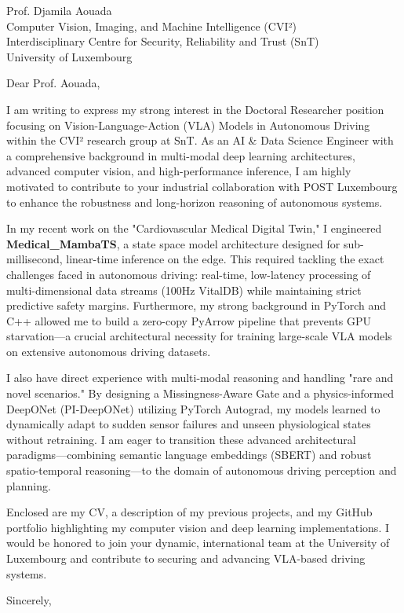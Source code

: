 \documentclass[11pt,a4paper]{letter}
\begin{document}
\begin{letter}{
    Prof. Djamila Aouada \\
    Computer Vision, Imaging, and Machine Intelligence (CVI²) \\
    Interdisciplinary Centre for Security, Reliability and Trust (SnT) \\
    University of Luxembourg
}

\opening{Dear Prof. Aouada,}

I am writing to express my strong interest in the Doctoral Researcher position focusing on Vision-Language-Action (VLA) Models in Autonomous Driving within the CVI² research group at SnT. As an AI \& Data Science Engineer with a comprehensive background in multi-modal deep learning architectures, advanced computer vision, and high-performance inference, I am highly motivated to contribute to your industrial collaboration with POST Luxembourg to enhance the robustness and long-horizon reasoning of autonomous systems.

In my recent work on the "Cardiovascular Medical Digital Twin," I engineered \textbf{Medical\_MambaTS}, a state space model architecture designed for sub-millisecond, linear-time inference on the edge. This required tackling the exact challenges faced in autonomous driving: real-time, low-latency processing of multi-dimensional data streams (100Hz VitalDB) while maintaining strict predictive safety margins. Furthermore, my strong background in PyTorch and C++ allowed me to build a zero-copy PyArrow pipeline that prevents GPU starvation—a crucial architectural necessity for training large-scale VLA models on extensive autonomous driving datasets.

I also have direct experience with multi-modal reasoning and handling "rare and novel scenarios." By designing a Missingness-Aware Gate and a physics-informed DeepONet (PI-DeepONet) utilizing PyTorch Autograd, my models learned to dynamically adapt to sudden sensor failures and unseen physiological states without retraining. I am eager to transition these advanced architectural paradigms—combining semantic language embeddings (SBERT) and robust spatio-temporal reasoning—to the domain of autonomous driving perception and planning.

Enclosed are my CV, a description of my previous projects, and my GitHub portfolio highlighting my computer vision and deep learning implementations. I would be honored to join your dynamic, international team at the University of Luxembourg and contribute to securing and advancing VLA-based driving systems.

\closing{Sincerely,}

\end{letter}
\end{document}
